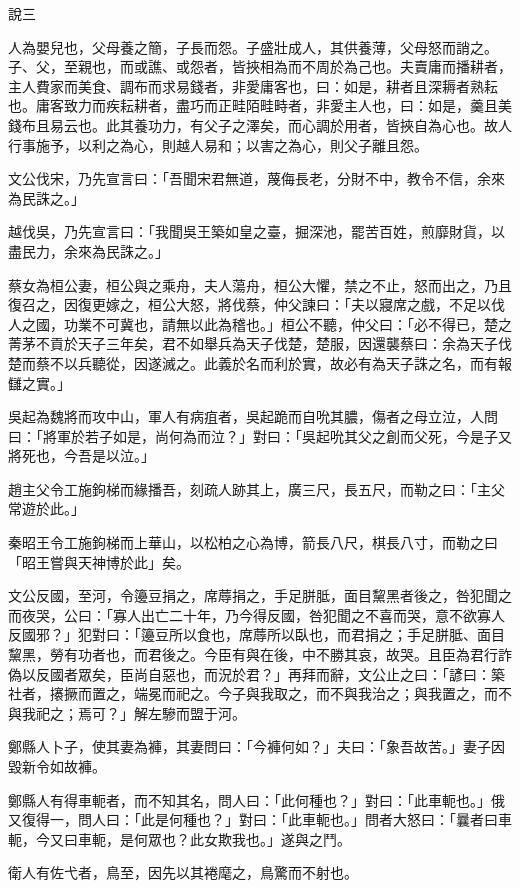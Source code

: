 \begin{pinyinscope}
說三

人為嬰兒也，父母養之簡，子長而怨。子盛壯成人，其供養薄，父母怒而誚之。子、父，至親也，而或譙、或怨者，皆挾相為而不周於為己也。夫賣庸而播耕者，主人費家而美食、調布而求易錢者，非愛庸客也，曰：如是，耕者且深耨者熟耘也。庸客致力而疾耘耕者，盡巧而正畦陌畦畤者，非愛主人也，曰：如是，羹且美錢布且易云也。此其養功力，有父子之澤矣，而心調於用者，皆挾自為心也。故人行事施予，以利之為心，則越人易和；以害之為心，則父子離且怨。

文公伐宋，乃先宣言曰：「吾聞宋君無道，蔑侮長老，分財不中，教令不信，余來為民誅之。」

越伐吳，乃先宣言曰：「我聞吳王築如皇之臺，掘深池，罷苦百姓，煎靡財貨，以盡民力，余來為民誅之。」

蔡女為桓公妻，桓公與之乘舟，夫人蕩舟，桓公大懼，禁之不止，怒而出之，乃且復召之，因復更嫁之，桓公大怒，將伐蔡，仲父諫曰：「夫以寢席之戲，不足以伐人之國，功業不可冀也，請無以此為稽也。」桓公不聽，仲父曰：「必不得已，楚之菁茅不貢於天子三年矣，君不如舉兵為天子伐楚，楚服，因還襲蔡曰：余為天子伐楚而蔡不以兵聽從，因遂滅之。此義於名而利於實，故必有為天子誅之名，而有報讎之實。」

吳起為魏將而攻中山，軍人有病疽者，吳起跪而自吮其膿，傷者之母立泣，人問曰：「將軍於若子如是，尚何為而泣？」對曰：「吳起吮其父之創而父死，今是子又將死也，今吾是以泣。」

趙主父令工施鉤梯而緣播吾，刻疏人跡其上，廣三尺，長五尺，而勒之曰：「主父常遊於此。」

秦昭王令工施鉤梯而上華山，以松柏之心為博，箭長八尺，棋長八寸，而勒之曰「昭王嘗與天神博於此」矣。

文公反國，至河，令籩豆捐之，席蓐捐之，手足胼胝，面目黧黑者後之，咎犯聞之而夜哭，公曰：「寡人出亡二十年，乃今得反國，咎犯聞之不喜而哭，意不欲寡人反國邪？」犯對曰：「籩豆所以食也，席蓐所以臥也，而君捐之；手足胼胝、面目黧黑，勞有功者也，而君後之。今臣有與在後，中不勝其哀，故哭。且臣為君行詐偽以反國者眾矣，臣尚自惡也，而況於君？」再拜而辭，文公止之曰：「諺曰：築社者，攐撅而置之，端冕而祀之。今子與我取之，而不與我治之；與我置之，而不與我祀之；焉可？」解左驂而盟于河。

鄭縣人卜子，使其妻為褲，其妻問曰：「今褲何如？」夫曰：「象吾故苦。」妻子因毀新令如故褲。

鄭縣人有得車軛者，而不知其名，問人曰：「此何種也？」對曰：「此車軛也。」俄又復得一，問人曰：「此是何種也？」對曰：「此車軛也。」問者大怒曰：「曩者曰車軛，今又曰車軛，是何眾也？此女欺我也。」遂與之鬥。

衛人有佐弋者，鳥至，因先以其裷麾之，鳥驚而不射也。


\end{pinyinscope}
